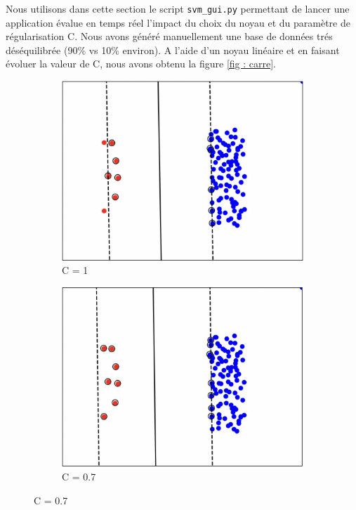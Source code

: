 \documentclass[a4paper,12pt]{article}
\begin{document}
Nous utilisons dans cette section le script \texttt{svm\_gui.py}  permettant de lancer une application évalue en temps réel l’impact du choix du noyau et du paramètre de régularisation C.
Nous avons généré manuellement une base de données trés déséquilibrée (90\% vs 10\% environ). 
A l'aide d'un noyau linéaire et en faisant évoluer la valeur de C, nous avons obtenu la figure \ref{fig : carre}.


\begin{figure}[H]
    \centering
    \begin{subfigure}[b]{0.45\textwidth}
        \centering
        \includegraphics[width=\textwidth]{Images/C=1.png}
        \caption{C = 1}
    \end{subfigure}
    \hfill
    \begin{subfigure}[b]{0.45\textwidth}
        \centering
        \includegraphics[width=\textwidth]{Images/C=0.7.png}
        \caption{C = 0.7}
    \end{subfigure}


\end{figure}
\end{document}
